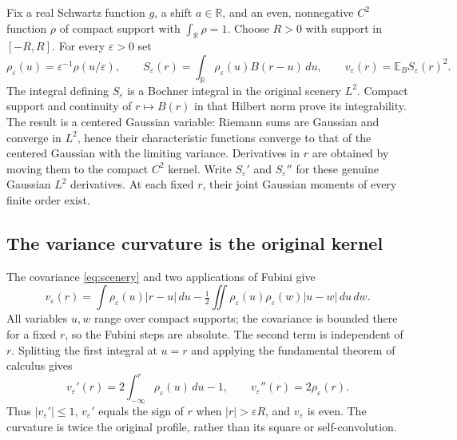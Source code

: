 \documentclass[11pt]{article}
\newcommand{\R}{\mathbb R}
\newcommand{\E}{\mathbb E}
\begin{document}
Fix a real Schwartz function $g$, a shift $a\in\R$, and an even,
nonnegative $C^2$ function $\rho$ of compact support with
$\int_\R\rho=1$. Choose $R>0$ with support in $[-R,R]$. For every
$\varepsilon>0$ set
\[
 \rho_\varepsilon(u)=\varepsilon^{-1}\rho(u/\varepsilon),\qquad
 S_\varepsilon(r)=\int_\R\rho_\varepsilon(u)B(r-u)\,du,
 \qquad v_\varepsilon(r)=\E_B S_\varepsilon(r)^2.
\]
The integral defining $S_\varepsilon$ is a Bochner integral in the
original scenery $L^2$. Compact support and continuity of
$r\mapsto B(r)$ in that Hilbert norm prove its integrability.
The result is a centered Gaussian variable: Riemann sums are
Gaussian and converge in $L^2$, hence their characteristic
functions converge to that of the centered Gaussian with the
limiting variance. Derivatives in $r$ are obtained by moving them
to the compact $C^2$ kernel. Write $S_\varepsilon'$ and
$S_\varepsilon''$ for these genuine Gaussian $L^2$ derivatives.
At each fixed $r$, their joint Gaussian moments of every finite
order exist.

\subsection*{The variance curvature is the original kernel}
The covariance \eqref{eq:scenery} and two applications of Fubini give
\begin{equation}\label{eq:smoothedvariance}
 v_\varepsilon(r)=\int\rho_\varepsilon(u)|r-u|\,du
 -\tfrac12\iint\rho_\varepsilon(u)\rho_\varepsilon(w)|u-w|\,du\,dw.
\end{equation}
All variables $u,w$ range over compact supports; the covariance
is bounded there for a fixed $r$, so the Fubini steps are absolute.
The second term is independent of $r$. Splitting the first
integral at $u=r$ and applying the fundamental theorem of calculus
gives
\begin{equation}\label{eq:variancecurvature}
 v_\varepsilon'(r)=2\int_{-\infty}^r\rho_\varepsilon(u)\,du-1,
 \qquad v_\varepsilon''(r)=2\rho_\varepsilon(r).
\end{equation}
Thus $|v_\varepsilon'|\leq1$, $v_\varepsilon'$ equals the sign of
$r$ when $|r|>\varepsilon R$, and $v_\varepsilon$ is even.
The curvature is twice the original profile, rather than its
square or self-convolution.
\end{document}
